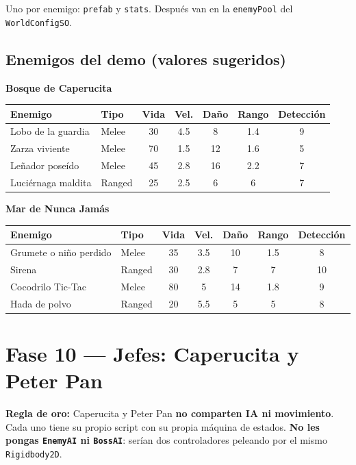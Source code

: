 \documentclass[a4paper,12pt]{article}
\newcommand{\code}[1]{\texttt{#1}}
\begin{document}
Uno por enemigo: \code{prefab} y \code{stats}. Después van en la \code{enemyPool} del
\code{WorldConfigSO}.

\subsection{Enemigos del demo (valores sugeridos)}

\textbf{Bosque de Caperucita}

\begin{center}
\begin{longtable}{|l|l|c|c|c|c|c|}
\hline
\textbf{Enemigo} & \textbf{Tipo} & \textbf{Vida} & \textbf{Vel.} & \textbf{Daño} & \textbf{Rango} & \textbf{Detección} \\
\hline
\endhead
Lobo de la guardia & Melee & 30 & 4.5 & 8 & 1.4 & 9 \\
\hline
Zarza viviente & Melee & 70 & 1.5 & 12 & 1.6 & 5 \\
\hline
Leñador poseído & Melee & 45 & 2.8 & 16 & 2.2 & 7 \\
\hline
Luciérnaga maldita & Ranged & 25 & 2.5 & 6 & 6 & 7 \\
\hline
\end{longtable}
\end{center}

\textbf{Mar de Nunca Jamás}

\begin{center}
\begin{longtable}{|l|l|c|c|c|c|c|}
\hline
\textbf{Enemigo} & \textbf{Tipo} & \textbf{Vida} & \textbf{Vel.} & \textbf{Daño} & \textbf{Rango} & \textbf{Detección} \\
\hline
\endhead
Grumete o niño perdido & Melee & 35 & 3.5 & 10 & 1.5 & 8 \\
\hline
Sirena & Ranged & 30 & 2.8 & 7 & 7 & 10 \\
\hline
Cocodrilo Tic-Tac & Melee & 80 & 5 & 14 & 1.8 & 9 \\
\hline
Hada de polvo & Ranged & 20 & 5.5 & 5 & 5 & 8 \\
\hline
\end{longtable}
\end{center}

\section{Fase 10 --- Jefes: Caperucita y Peter Pan}

\textbf{Regla de oro:} Caperucita y Peter Pan \textbf{no comparten IA ni movimiento}. Cada uno
tiene su propio script con su propia máquina de estados. \textbf{No les pongas \code{EnemyAI} ni
\code{BossAI}}: serían dos controladores peleando por el mismo \code{Rigidbody2D}.
\end{document}
